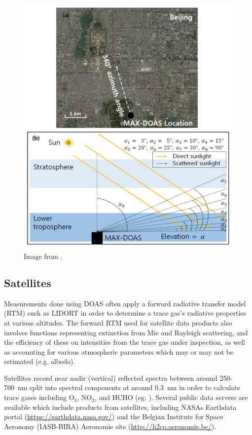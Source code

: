     \begin{figure}
      \includegraphics[width=\textwidth]{Figures/MAXDoasExample.png}
      \caption{ Image from \cite{Lee2015}.}
      \label{LR:HCHO:fig_MAXDOASExample}
    \end{figure}
    
  \subsection{Satellites}
  \label{Model:Meas:sat}
    Measurements done using DOAS often apply a forward radiative transfer model (RTM) such as LIDORT in order to determine a trace gas's radiative properties at various altitudes.
    The forward RTM used for satellite data products also involves functions representing extinction from Mie and Rayleigh scattering, and the efficiency of these on intensities from the trace gas under inspection, as well as accounting for various atmospheric parameters which may or may not be estimated (e.g. albedo).
    
    Satellites record near nadir (vertical) reflected spectra between around 250-700~nm split into spectral components at around $0.3$~nm in order to calculate trace gases including O$_3$, NO$_2$, and HCHO (eg: \cite{Leue2001}).
    Several public data servers are available which include products from satellites, including NASAs Earthdata portal (\url{https://earthdata.nasa.gov/}) and the Belgian Institute for Space Aeronomy (IASB-BIRA) Aeronomie site (\url{http://h2co.aeronomie.be/}).
    

